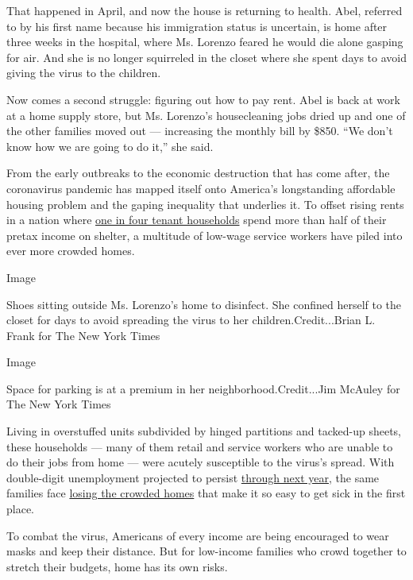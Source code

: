 That happened in April, and now the house is returning to health. Abel,
referred to by his first name because his immigration status is
uncertain, is home after three weeks in the hospital, where Ms. Lorenzo
feared he would die alone gasping for air. And she is no longer
squirreled in the closet where she spent days to avoid giving the virus
to the children.

Now comes a second struggle: figuring out how to pay rent. Abel is back
at work at a home supply store, but Ms. Lorenzo's housecleaning jobs
dried up and one of the other families moved out --- increasing the
monthly bill by \$850. ``We don't know how we are going to do it,'' she
said.

From the early outbreaks to the economic destruction that has come
after, the coronavirus pandemic has mapped itself onto America's
longstanding affordable housing problem and the gaping inequality that
underlies it. To offset rising rents in a nation where
\href{https://www.jchs.harvard.edu/sites/default/files/Harvard_JCHS_Americas_Rental_Housing_2020.pdf}{one
in four tenant households} spend more than half of their pretax income
on shelter, a multitude of low-wage service workers have piled into ever
more crowded homes.

Image

Shoes sitting outside Ms. Lorenzo's home to disinfect. She confined
herself to the closet for days to avoid spreading the virus to her
children.Credit...Brian L. Frank for The New York Times

Image

Space for parking is at a premium in her neighborhood.Credit...Jim
McAuley for The New York Times

Living in overstuffed units subdivided by hinged partitions and
tacked-up sheets, these households --- many of them retail and service
workers who are unable to do their jobs from home --- were acutely
susceptible to the virus's spread. With double-digit unemployment
projected to persist
\href{https://www.nytimes3xbfgragh.onion/2020/07/15/business/economy/economic-recovery-coronavirus-resurgence.html}{through
next year}, the same families face
\href{https://www.nytimes3xbfgragh.onion/2020/05/27/us/coronavirus-evictions-renters.html}{losing
the crowded homes} that make it so easy to get sick in the first place.

To combat the virus, Americans of every income are being encouraged to
wear masks and keep their distance. But for low-income families who
crowd together to stretch their budgets, home has its own risks.

